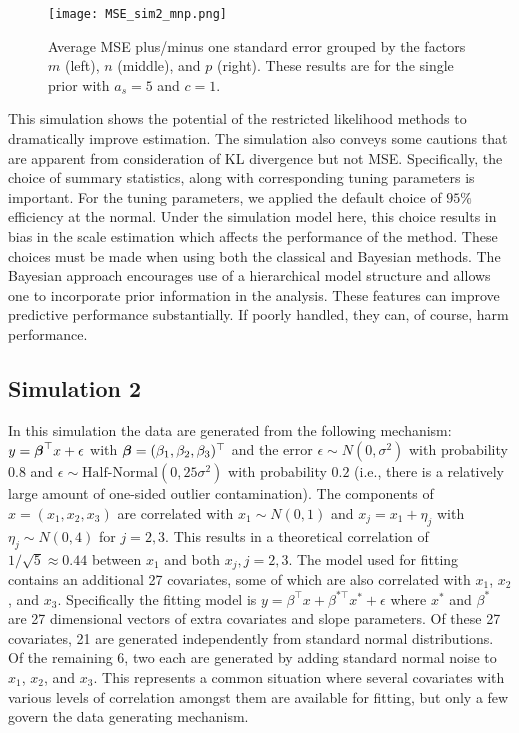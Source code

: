 \documentclass[ba]{imsart}
\def\bbeta{\mbox{\boldmath $\beta$}}
\newcommand{\response}[1]{{\color{blue}#1}}
\begin{document}
\begin{figure}[t]
\centering
\texttt{[image: MSE\_sim2\_mnp.png]}
\caption{Average MSE plus/minus one standard error grouped by the factors $m$ (left), $n$ (middle), and $p$ (right). These results are for the single prior with $a_s = 5$ and $c = 1$.}
\label{mse_mnp}
\end{figure}

\response{This simulation shows the potential of the restricted likelihood methods to dramatically improve estimation.  The simulation also conveys some cautions that are apparent from consideration of KL divergence but not MSE.  Specifically, the choice of summary statistics, along with corresponding tuning parameters is important. For the tuning parameters, we applied the default choice of $95\%$ efficiency at the normal.  Under the simulation model here, this choice results in bias in the scale estimation which affects the performance of the method. These choices must be made when using both the classical and Bayesian methods. The Bayesian approach encourages use of a hierarchical model structure and allows one to incorporate prior information in the analysis.  These features can improve predictive performance substantially.  If poorly handled, they can, of course, harm performance. }


\subsection{\response{Simulation 2}}

In this simulation the data are generated from the following mechanism: $y = \bbeta^{\top}x + \epsilon$
with $\bbeta = (\beta_{1}, \beta_{2},\beta_{3})^{\top}$ and the error $\epsilon \sim N(0,\sigma^{2})$ with probability $0.8$ and $\epsilon \sim \text{Half-Normal}(0,25\sigma^{2})$ with probability $0.2$ (i.e., there is a relatively large amount of one-sided outlier contamination). The components of $x = (x_{1}, x_{2}, x_{3})$ are correlated with $x_1 \sim N(0,1)$ and $x_{j} = x_{1} + \eta_{j}$ with $\eta_{j} \sim N(0, 4)$ for $j = 2,3$. This results in a theoretical correlation of $1/\sqrt{5} \approx 0.44$ between $x_{1}$ and both $x_{j}, j = 2, 3$. The model used for fitting contains an additional 27 covariates, some of which are also correlated with $x_{1}$, $x_{2}$, and $x_{3}$. Specifically the fitting model is $y = \beta^{\top} x + \beta^{*\top} x^{*} + \epsilon$ where $x^{*}$ and $\beta^{*}$ are 27 dimensional vectors of extra covariates and slope parameters. Of these 27 covariates, 21 are generated independently from standard normal distributions. Of the remaining 6, two each are generated by adding standard normal noise to $x_{1}$, $x_{2}$, and $x_{3}$. This represents a common situation where several covariates with various levels of correlation amongst them are available for fitting, but only a few govern the data generating mechanism.
\end{document}
